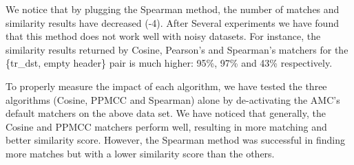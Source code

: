 \begin{table}[ht]
\centering
{}
\caption{ Similarity Scores Using the AMC Default Matching Algorithms + Spearman Similarity Method}
\label{tab:Similarity_Scores_Using_the_AMC_Default_Matching_Algorithms_+_Spearman_Similarity_Method}
\end{table}

We notice that by plugging the Spearman method, the number of matches and similarity results have decreased (-4). After Several experiments we have found that this method does not work well with noisy datasets. For instance, the similarity results returned by Cosine, Pearson's and Spearman's matchers for the \{tr\_dst, empty header\} pair is much higher: 95\%, 97\% and 43\% respectively.

To properly measure the impact of each algorithm, we have tested the three algorithms (Cosine, PPMCC and Spearman) alone by de-activating the AMC's default matchers on the above data set. We have noticed that generally, the Cosine and PPMCC matchers perform well, resulting in more matching and better similarity score. However, the Spearman method was successful in finding more matches but with a lower similarity score than the others.

